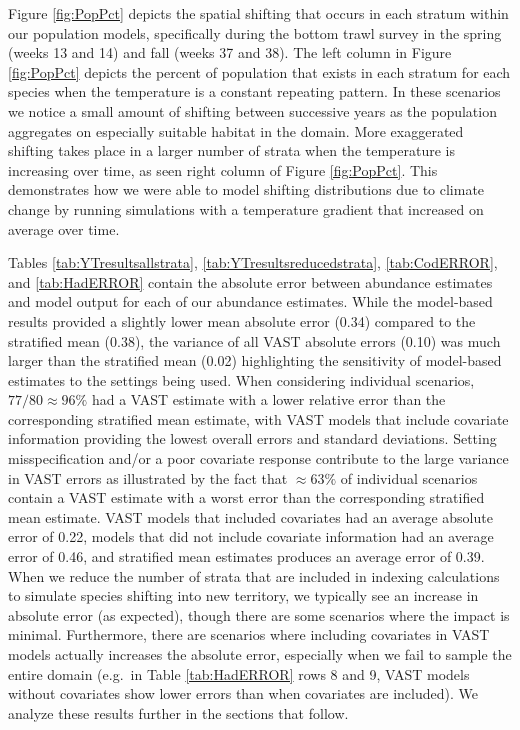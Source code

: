 \documentclass[
  12pt,
]{article}
\begin{document}
Figure \ref{fig:PopPct} depicts the spatial shifting that occurs in each stratum within our population models, specifically during the bottom trawl survey in the spring (weeks 13 and 14) and fall (weeks 37 and 38). The left column in Figure \ref{fig:PopPct} depicts the percent of population that exists in each stratum for each species when the temperature is a constant repeating pattern. In these scenarios we notice a small amount of shifting between successive years as the population aggregates on especially suitable habitat in the domain. More exaggerated shifting takes place in a larger number of strata when the temperature is increasing over time, as seen right column of Figure \ref{fig:PopPct}. This demonstrates how we were able to model shifting distributions due to climate change by running simulations with a temperature gradient that increased on average over time.

Tables \ref{tab:YTresultsallstrata}, \ref{tab:YTresultsreducedstrata}, \ref{tab:CodERROR}, and \ref{tab:HadERROR} contain the absolute error between abundance estimates and model output for each of our abundance estimates. While the model-based results provided a slightly lower mean absolute error (0.34) compared to the stratified mean (0.38), the variance of all VAST absolute errors (0.10) was much larger than the stratified mean (0.02) highlighting the sensitivity of model-based estimates to the settings being used. When considering individual scenarios, \(77/80\approx 96\%\) had a VAST estimate with a lower relative error than the corresponding stratified mean estimate, with VAST models that include covariate information providing the lowest overall errors and standard deviations. Setting misspecification and/or a poor covariate response contribute to the large variance in VAST errors as illustrated by the fact that \(\approx 63\%\) of individual scenarios contain a VAST estimate with a worst error than the corresponding stratified mean estimate. VAST models that included covariates had an average absolute error of 0.22, models that did not include covariate information had an average error of 0.46, and stratified mean estimates produces an average error of 0.39. When we reduce the number of strata that are included in indexing calculations to simulate species shifting into new territory, we typically see an increase in absolute error (as expected), though there are some scenarios where the impact is minimal. Furthermore, there are scenarios where including covariates in VAST models actually increases the absolute error, especially when we fail to sample the entire domain (e.g.~in Table \ref{tab:HadERROR} rows 8 and 9, VAST models without covariates show lower errors than when covariates are included). We analyze these results further in the sections that follow.
\end{document}
